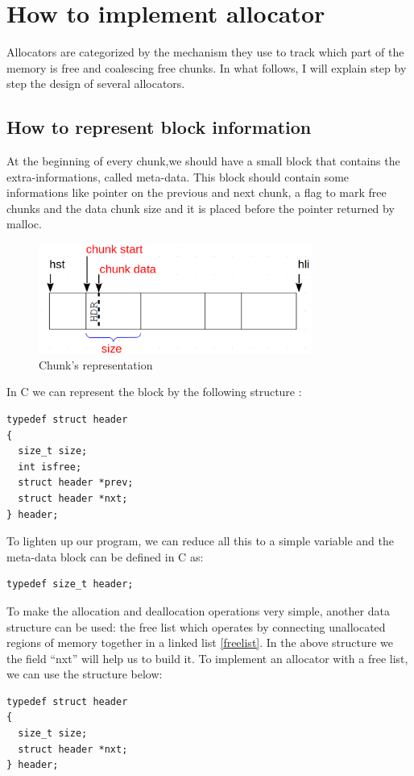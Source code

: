 \section{How to implement allocator}
 Allocators are categorized by the mechanism they use to track which part of the memory is free and coalescing free chunks.
In what follows, I will explain step by step the design of several allocators.

\subsection{How to represent block information}
At the beginning of every chunk,we should have a small block that contains the extra-informations, called meta-data. This block should contain some informations like pointer on the previous and next chunk, a flag to mark free chunks and the data chunk size and it is placed before the pointer returned by malloc.

\begin{figure}[htbp]
    \begin{center}
        \includegraphics[width=0.8\textwidth]{figures/chunk}
    \caption{Chunk's representation }
    \label{chunkrep}
    \end{center}
\end{figure}

In C we can represent the block by the following structure :
\begin{lstlisting}[style=cstyle]
typedef struct header
{
  size_t size;
  int isfree;
  struct header *prev;
  struct header *nxt;
} header;
\end{lstlisting}

To lighten up our program, we can reduce all this to a simple variable and the meta-data block can be defined in C as:
\begin{lstlisting}[style=cstyle]
typedef size_t header;
\end{lstlisting}

To make the allocation and deallocation operations very simple, another data structure can be used: the free list which operates by connecting unallocated regions of memory together in a linked list \ref{freelist}. In the above structure we the field ``nxt'' will help us to build it.
To implement an allocator with a free list, we can use the structure below:
\begin{lstlisting}[style=cstyle]
typedef struct header
{
  size_t size;			
  struct header *nxt;
} header;
\end{lstlisting}

